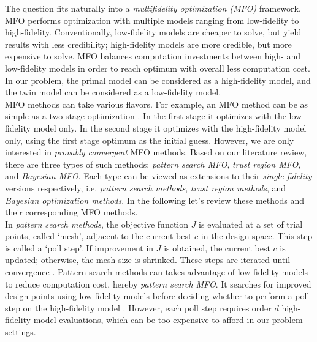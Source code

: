 \documentclass[a4paper,onecolumn]{article}
\theoremstyle{remark}
\begin{document}
\noindent The question fits naturally into a \emph{multifidelity optimization (MFO)} framework.
MFO performs optimization with multiple models ranging from
low-fidelity to high-fidelity. Conventionally, low-fidelity models are cheaper to solve, but yield
results with less credibility; high-fidelity models are more credible, but more expensive
to solve. MFO balances computation investments between high- and low-fidelity models
in order to reach optimum with overall less computation cost.
In our problem, the primal model can be considered as a high-fidelity model, and the twin model
can be considered as a low-fidelity model.\\

\noindent MFO methods can take various flavors.
For example, an MFO method can be as simple as a two-stage optimization \cite{MFO: two stage}. 
In the first stage it optimizes with the low-fidelity model only. In the second stage
it optimizes with the high-fidelity model only, using the first stage optimum as the initial guess.
However, we are only interested in \emph{provably convergent} MFO methods.
Based on our literature review, there are three types of such methods:
\emph{pattern search MFO}, \emph{trust region MFO}, and \emph{Bayesian MFO}.
Each type can be viewed as 
extensions to their \emph{single-fidelity} versions respectively,
i.e. \emph{pattern search methods}, \emph{trust region methods}, and \emph{Bayesian 
optimization methods}. In the following let's review these methods and 
their corresponding MFO methods.\\

\noindent In \emph{pattern search methods}, the objective function $J$ is evaluated at a set of
trial points, called `mesh', adjacent to the current best $c$ in the design space. This
step is called a `poll step'.
If improvement in $J$ is obtained, the current best $c$ is updated; otherwise, the mesh size
is shrinked. 
These steps are iterated until convergence \cite{Pattern Search Convergence}.
Pattern search methods can takes advantage of low-fidelity models to reduce computation cost,
hereby \emph{pattern search MFO}.
It searches for improved design 
points using low-fidelity models before deciding whether to perform a poll step on
the high-fidelity model \cite{Pattern Search Convergence MFO}.
However, each poll step requires order $d$ high-fidelity model evaluations, which can
be too expensive to afford in our problem settings.\\
\end{document}
